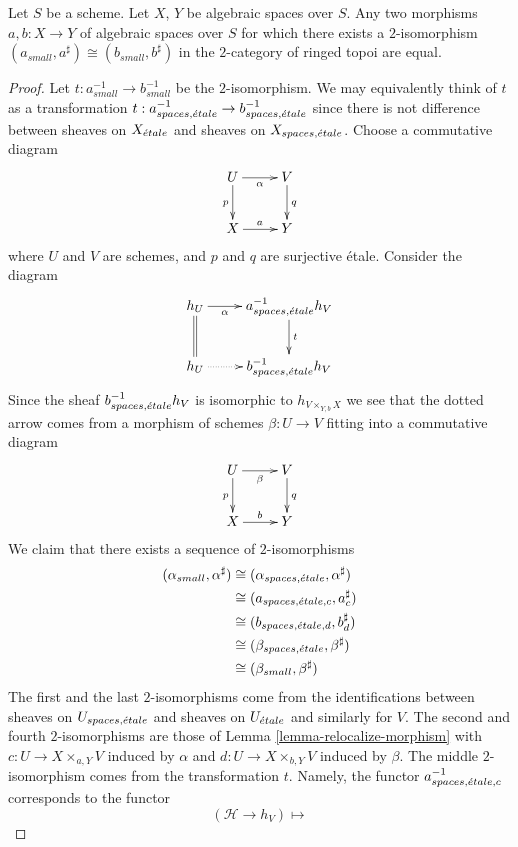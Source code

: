 \begin{lemma}
\label{lemma-faithful}
Let $S$ be a scheme.
Let $X$, $Y$ be algebraic spaces over $S$.
Any two morphisms $a, b : X \to Y$ of algebraic spaces over $S$
for which there exists a $2$-isomorphism
$(a_{small}, a^\sharp) \cong (b_{small}, b^\sharp)$
in the $2$-category of ringed topoi are equal.
\end{lemma}

\begin{proof}
Let $t : a_{small}^{-1} \to b_{small}^{-1}$ be the $2$-isomorphism.
We may equivalently think of $t$ as a transformation
$t : a_{spaces, {\acute{e}tale}}^{-1} \to b_{spaces, {\acute{e}tale}}^{-1}$
since there is not difference between sheaves on $X_{\acute{e}tale}$
and sheaves on $X_{spaces, {\acute{e}tale}}$.
Choose a commutative diagram
$$
\xymatrix{
U \ar[d]_p \ar[r]_\alpha  & V \ar[d]^q \\
X \ar[r]^a & Y
}
$$
where $U$ and $V$ are schemes, and $p$ and $q$ are surjective \'etale.
Consider the diagram
$$
\xymatrix{
h_U \ar[r]_-\alpha \ar@{=}[d] & a_{spaces, \etale}^{-1}h_V \ar[d]^t \\
h_U \ar@{..>}[r] & b_{spaces, \etale}^{-1}h_V
}
$$
Since the sheaf $b_{spaces, {\acute{e}tale}}^{-1}h_V$ is isomorphic to
$h_{V \times_{Y, b} X}$ we see that the dotted arrow comes from a
morphism of schemes
$\beta : U \to V$ fitting into a commutative diagram
$$
\xymatrix{
U \ar[d]_p \ar[r]_\beta  & V \ar[d]^q \\
X \ar[r]^b & Y
}
$$
We claim that there exists a sequence of $2$-isomorphisms
\begin{align*}
(\alpha_{small}, \alpha^\sharp)
& \cong
(\alpha_{spaces, {\acute{e}tale}}, \alpha^\sharp) \\
& \cong
(a_{spaces, {\acute{e}tale}, c}, a_c^\sharp) \\
& \cong
(b_{spaces, {\acute{e}tale}, d}, b_d^\sharp) \\
& \cong
(\beta_{spaces, {\acute{e}tale}}, \beta^\sharp) \\
& \cong
(\beta_{small}, \beta^\sharp)
\end{align*}
The first and the last $2$-isomorphisms come from the identifications
between sheaves on $U_{spaces, {\acute{e}tale}}$ and sheaves on
$U_{\acute{e}tale}$ and similarly for $V$. The second and fourth
$2$-isomorphisms are those of
Lemma \ref{lemma-relocalize-morphism}
with $c : U \to X \times_{a, Y} V$ induced by $\alpha$ and
$d : U \to X \times_{b, Y} V$ induced by $\beta$.
The middle $2$-isomorphism comes from the transformation $t$.
Namely, the functor $a_{spaces, {\acute{e}tale}, c}^{-1}$ corresponds
to the functor
$$
(\mathcal{H} \to h_V) \longmapsto
$$
\end{proof}
